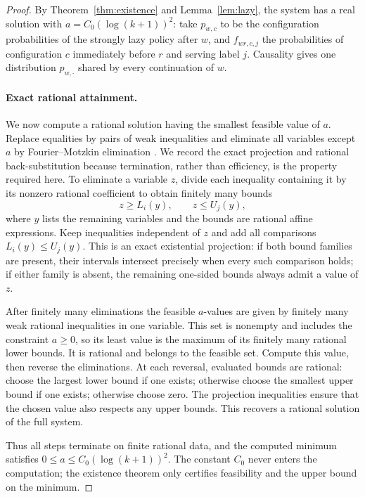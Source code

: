 \begin{proof}
By Theorem~\ref{thm:existence} and Lemma~\ref{lem:lazy}, the system has
a real solution with $a=C_0(\log(k+1))^2$: take $p_{w,c}$ to be the
configuration probabilities of the strongly lazy policy after $w$,
and $f_{wr,c,j}$ the probabilities of configuration $c$ immediately
before $r$ and serving label $j$. Causality gives one distribution
$p_{w,\cdot}$ shared by every continuation of $w$.

\paragraph{Exact rational attainment.}
We now compute a rational solution having the smallest feasible value
of $a$. Replace equalities by pairs of weak inequalities and eliminate
all variables except $a$ by Fourier--Motzkin elimination
\cite{DantzigEaves1973}. We record the exact projection and rational
back-substitution because termination, rather than efficiency, is the
property required here. To eliminate a variable $z$, divide each inequality
containing it by
its nonzero rational coefficient to obtain finitely many bounds
\[
 z\ge L_i(y),\qquad z\le U_j(y),
\]
where $y$ lists the remaining variables and the bounds are rational
affine expressions. Keep inequalities independent of $z$ and add all
comparisons $L_i(y)\le U_j(y)$. This is an exact existential projection:
if both bound families are present, their intervals intersect precisely
when every such comparison holds; if either family is absent, the
remaining one-sided bounds always admit a value of $z$.

After finitely many eliminations the feasible $a$-values are given by
finitely many weak rational inequalities in one variable. This set is
nonempty and includes the constraint $a\ge0$, so its least value is
the maximum of its finitely many rational lower bounds. It is rational
and belongs to the feasible set. Compute this value, then reverse the
eliminations. At each reversal, evaluated bounds are rational: choose
the largest lower bound if one exists; otherwise choose the smallest
upper bound if one exists; otherwise choose zero. The projection
inequalities ensure that the chosen value also respects any upper
bounds. This recovers a rational solution of the full system.

Thus all steps terminate on finite rational data, and the computed
minimum satisfies $0\le a\le C_0(\log(k+1))^2$. The constant $C_0$
never enters the computation; the existence theorem only certifies
feasibility and the upper bound on the minimum.


\end{proof}
